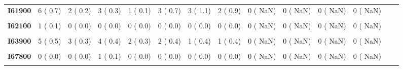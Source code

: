 \documentclass[
]{article}
\begin{document}
\begin{table}[H]
\begin{tabular}[t]{>{\raggedright\arraybackslash}p{5em}ccccccccccccc}
\textbf{I61900} & 6 (  0.7) & 2 (  0.2) & 3 (  0.3) & 1 (  0.1) & 3 (  0.7) & 3 (  1.1) & 2 (  0.9) & 0 (  NaN) & 0 (  NaN) & 0 (  NaN) & 0 (  NaN) &  & \\
\textbf{\cellcolor{gray!10}{I62000}} & \cellcolor{gray!10}{2 (  0.2)} & \cellcolor{gray!10}{1 (  0.1)} & \cellcolor{gray!10}{0 (  0.0)} & \cellcolor{gray!10}{0 (  0.0)} & \cellcolor{gray!10}{1 (  0.2)} & \cellcolor{gray!10}{0 (  0.0)} & \cellcolor{gray!10}{0 (  0.0)} & \cellcolor{gray!10}{0 (  NaN)} & \cellcolor{gray!10}{0 (  NaN)} & \cellcolor{gray!10}{0 (  NaN)} & \cellcolor{gray!10}{0 (  NaN)} & \cellcolor{gray!10}{} & \cellcolor{gray!10}{}\\
\textbf{I62100} & 1 (  0.1) & 0 (  0.0) & 0 (  0.0) & 0 (  0.0) & 0 (  0.0) & 0 (  0.0) & 0 (  0.0) & 0 (  NaN) & 0 (  NaN) & 0 (  NaN) & 0 (  NaN) &  & \\
\textbf{\cellcolor{gray!10}{I62900}} & \cellcolor{gray!10}{1 (  0.1)} & \cellcolor{gray!10}{1 (  0.1)} & \cellcolor{gray!10}{1 (  0.1)} & \cellcolor{gray!10}{0 (  0.0)} & \cellcolor{gray!10}{1 (  0.2)} & \cellcolor{gray!10}{0 (  0.0)} & \cellcolor{gray!10}{0 (  0.0)} & \cellcolor{gray!10}{0 (  NaN)} & \cellcolor{gray!10}{0 (  NaN)} & \cellcolor{gray!10}{0 (  NaN)} & \cellcolor{gray!10}{0 (  NaN)} & \cellcolor{gray!10}{} & \cellcolor{gray!10}{}\\
\textbf{I63900} & 5 (  0.5) & 3 (  0.3) & 4 (  0.4) & 2 (  0.3) & 2 (  0.4) & 1 (  0.4) & 1 (  0.4) & 0 (  NaN) & 0 (  NaN) & 0 (  NaN) & 0 (  NaN) &  & \\
\textbf{\cellcolor{gray!10}{I64000}} & \cellcolor{gray!10}{25 (  2.7)} & \cellcolor{gray!10}{22 (  2.3)} & \cellcolor{gray!10}{19 (  2.1)} & \cellcolor{gray!10}{16 (  2.2)} & \cellcolor{gray!10}{7 (  1.5)} & \cellcolor{gray!10}{9 (  3.3)} & \cellcolor{gray!10}{3 (  1.3)} & \cellcolor{gray!10}{0 (  NaN)} & \cellcolor{gray!10}{0 (  NaN)} & \cellcolor{gray!10}{0 (  NaN)} & \cellcolor{gray!10}{0 (  NaN)} & \cellcolor{gray!10}{} & \cellcolor{gray!10}{}\\
\textbf{I67800} & 0 (  0.0) & 0 (  0.0) & 1 (  0.1) & 0 (  0.0) & 0 (  0.0) & 0 (  0.0) & 0 (  0.0) & 0 (  NaN) & 0 (  NaN) & 0 (  NaN) & 0 (  NaN) &  & \\
\textbf{\cellcolor{gray!10}{I67900}} & \cellcolor{gray!10}{0 (  0.0)} & \cellcolor{gray!10}{0 (  0.0)} & \cellcolor{gray!10}{0 (  0.0)} & \cellcolor{gray!10}{1 (  0.1)} & \cellcolor{gray!10}{0 (  0.0)} & \cellcolor{gray!10}{0 (  0.0)} & \cellcolor{gray!10}{0 (  0.0)} & \cellcolor{gray!10}{0 (  NaN)} & \cellcolor{gray!10}{0 (  NaN)} & \cellcolor{gray!10}{0 (  NaN)} & \cellcolor{gray!10}{0 (  NaN)} & \cellcolor{gray!10}{} & \cellcolor{gray!10}{}\\

\end{tabular}
\end{table}
\end{document}
